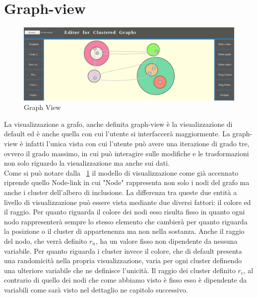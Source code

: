 {\section{Graph-view}
\begin{figure}[!htb]
	\begin{center}
		\includegraphics[width=1 \linewidth]{figure/graphView}
	\end{center}
	\caption{Graph View\label{fig:graphView}}
\end{figure}
La visualizzazione a grafo, anche definita graph-view è la visualizzazione di default ed è anche quella con cui l'utente si interfaccerà maggiormente. La graph-view è infatti l'unica vista con cui l'utente può avere una iterazione di grado tre, ovvero il grado massimo, in cui può interagire sulle modifiche e le trasformazioni non solo riguardo la visualizzazione ma anche sui dati.\\
Come si può notare dalla \figurename~\ref{fig:graphView} il modello di visualizzazione come già accennato riprende quello Node-link in cui "Node" rappresenta non solo i nodi del grafo ma anche i cluster dell'albero di inclusione. La differenza tra queste due entità a livello di visualizzazione può essere vista mediante due diversi fattori: il colore ed il raggio.
Per quanto riguarda il colore dei nodi esso risulta fisso in quanto ogni nodo rappresenterà sempre lo stesso elemento che cambierà per quanto riguarda la posizione o il cluster di appartenenza ma non nella sostanza. Anche il raggio del nodo, che verrà definito $r_n$, ha un valore fisso non dipendente da nessuna variabile.
Per quanto riguarda i cluster invece il colore, che di default presenta una randomicità nella propria visualizzazione, varia per ogni cluster definendo una ulteriore variabile che ne definisce l'unicità.
Il raggio dei cluster definito $r_c$, al contrario di quello dei nodi che come abbiamo visto è fisso esso è dipendente da variabili come sarà visto nel dettaglio ne capitolo successivo.

}
